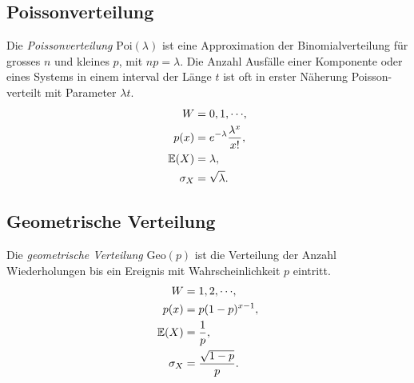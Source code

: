 \subsection{Poissonverteilung}
Die \emph{Poissonverteilung} $\mathrm{Poi}(\lambda)$ ist eine Approximation der Binomialverteilung für grosses $n$ und kleines $p$, mit $np = \lambda$. Die Anzahl Ausfälle einer Komponente oder eines Systems in einem interval der Länge $t$ ist oft in erster Näherung Poisson-verteilt mit Parameter $\lambda t$.
\begin{align*}
	W &= {0,1,\cdots},\\
	p(x) &= e^{-\lambda} \frac{\lambda^x}{x!},\\
	\operatorname{\mathbb E}(X) &= \lambda,\\
	\sigma_X &= \sqrt{\lambda}.
\end{align*}
\subsection{Geometrische Verteilung}
Die \emph{geometrische Verteilung} $\mathrm{Geo}(p)$ ist die Verteilung der Anzahl Wiederholungen bis ein Ereignis mit Wahrscheinlichkeit $p$ eintritt.
\begin{align*}
	W &= {1,2,\cdots},\\
	p(x) &= p(1-p)^{x-1},\\
	\operatorname{\mathbb E}(X) &= \frac{1}{p},\\
	\sigma_X &= \frac{\sqrt{1-p}}{p}.
\end{align*}
